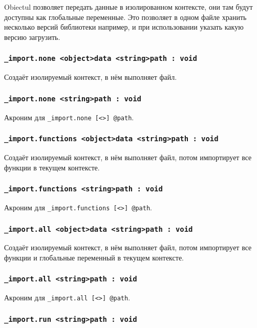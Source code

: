 Obiectul  позволяет передать данные в изолированном контексте, они там будут доступны как глобальные переменные. Это позволяет в одном файле хранить несколько версий библиотеки например, и при использовании указать какую версию загрузить.

\subsubsection{\lstinline|_import.none <object>data <string>path : void|}

Создаёт изолируемый контекст, в нём выполняет файл.

\subsubsection{\lstinline|_import.none <string>path : void|}

Акроним для \lstinline|_import.none [<>] @path|.

\subsubsection{\lstinline|_import.functions <object>data <string>path : void|}

Создаёт изолируемый контекст, в нём выполняет файл, потом импортирует все функции в текущем контексте.

\subsubsection{\lstinline|_import.functions <string>path : void|}

Акроним для \lstinline|_import.functions [<>] @path|.

\subsubsection{\lstinline|_import.all <object>data <string>path : void|}

Создаёт изолируемый контекст, в нём выполняет файл, потом импортирует все функции и глобальные переменный в текущем контексте.

\subsubsection{\lstinline|_import.all <string>path : void|}

Акроним для \lstinline|_import.all [<>] @path|.

\subsubsection{\lstinline|_import.run <string>path : void|}

